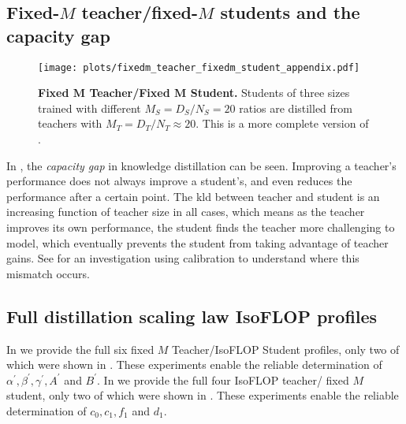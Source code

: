 \subsection{Fixed-\texorpdfstring{$M$}{M} teacher/fixed-\texorpdfstring{$M$}{M} students and the capacity gap}
\label{ssec:fixed-m-teacher-fixed-m-students}

\begin{figure}[h]
	\centering
        \vspace{-0.15cm}
		\texttt{[image: plots/fixedm\_teacher\_fixedm\_student\_appendix.pdf]}
        \vspace{-0.15cm}
	\caption{\textbf{Fixed $\bm M$ Teacher/Fixed $\bm M$ Student.} Students of three sizes trained with different $M_S=D_S/N_S=20$ ratios are distilled from teachers with $M_T=D_T/N_T\approx 20$.
	This is a more complete version of .}
        \vspace{-0.15cm}
	\label{fig:fixedm-teacher-fixedm-students-appendix}
\end{figure}

In , the \emph{capacity gap} in knowledge distillation can be seen.
Improving a teacher's performance does not always improve a student's, and even reduces the performance after a certain point.
The \gls{kld} between teacher and student is an increasing function of teacher size in all cases, which means as the teacher improves its own performance, the student finds the teacher more challenging to model, which eventually prevents the student from taking advantage of teacher gains.
See  for an investigation using calibration to understand where this mismatch occurs.

\FloatBarrier
\subsection{Full distillation scaling law IsoFLOP profiles}
\label{ssec:distillation-isoflop-profiles}
In  we provide the full six fixed $M$ Teacher/IsoFLOP Student profiles,
only two of which were shown in .
These experiments enable the reliable determination of $\alpha^\prime,\beta^\prime,\gamma^\prime,A^\prime$ and $B^\prime$.
In 
we provide the full four IsoFLOP teacher/ fixed $M$ student,
only two of which were shown in .
These experiments enable the reliable determination of $c_0,c_1,f_1$ and $d_1$.

